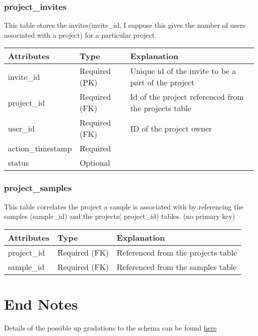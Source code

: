 \documentclass[letterpaper,10pt,english]{sphinxmanual}
\begin{document}
\subsection{project\_invites}
\label{Table_Description:project-invites}
This table stores the invites(invite\_id, I suppose this gives the number of users associated with a project) for a particular project.

\begin{tabulary}{\linewidth}{|L|L|L|}
\hline
\textbf{
Attributes
} & \textbf{
Type
} & \textbf{
Explanation
}\\\hline

invite\_id
 & 
Required (PK)
 & 
Unique id of the invite to be a part of the project
\\\hline

project\_id
 & 
Required (FK)
 & 
Id of the project referenced from the projects table
\\\hline

user\_id
 & 
Required (FK)
 & 
ID of the project owner
\\\hline

action\_timestamp
 & 
Required
 & \\\hline

status
 & 
Optional
 & \\\hline
\end{tabulary}



\subsection{project\_samples}
\label{Table_Description:project-samples}
This table correlates the project a sample is associated with by referencing the samples (sample\_id) and the projects( project\_id) tables. (no primary key)

\begin{tabulary}{\linewidth}{|L|L|L|}
\hline
\textbf{
Attributes
} & \textbf{
Type
} & \textbf{
Explanation
}\\\hline

project\_id
 & 
Required (FK)
 & 
Referenced from the projects table
\\\hline

sample\_id
 & 
Required (FK)
 & 
Referenced from the samples table
\\\hline
\end{tabulary}



\chapter{End Notes}
\label{Notes:notes}\label{Notes::doc}\label{Notes:end-notes}
Details of the possible up gradations to the schema can be found \href{https://github.com/metpetdb/metpetdb-py/blob/master/database/MetPetDBSchemav1.0.pdf}{here}
\end{document}
